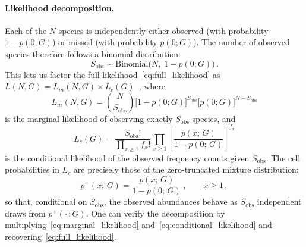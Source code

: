 \documentclass{article}
\begin{document}
{\paragraph{Likelihood decomposition.}
Each of the $N$ species is independently either observed (with probability $1 - p(0;G)$) or missed (with probability $p(0;G)$). The number of observed species therefore follows a binomial distribution:
\[
S_{\mathrm{obs}} \sim \mathrm{Binomial}\bigl(N,\; 1 - p(0;G)\bigr)\,.
\]
This lets us factor the full likelihood~\eqref{eq:full_likelihood} as $L(N,G) = L_m(N,G) \times L_c(G)$~\cite{sanathanan1972}, where
\begin{equation}\label{eq:marginal_likelihood}
    L_m(N,G) = \binom{N}{S_{\mathrm{obs}}} 
    \bigl[1 - p(0;G)\bigr]^{S_{\mathrm{obs}}} 
    \bigl[p(0;G)\bigr]^{N - S_{\mathrm{obs}}}
\end{equation}
is the marginal likelihood of observing exactly $S_{\mathrm{obs}}$ species, and
\begin{equation}\label{eq:conditional_likelihood}
    L_c(G) = \frac{S_{\mathrm{obs}}!}{\displaystyle\prod_{x \geq 1} f_x!} 
    \prod_{x \geq 1} \left[\frac{p(x;\, G)}{1 - p(0;\, G)}\right]^{f_x}
\end{equation}
is the conditional likelihood of the observed frequency counts given $S_{\mathrm{obs}}$. The cell probabilities in $L_c$ are precisely those of the zero-truncated mixture distribution:
\begin{equation}\label{eq:zero_truncated}
    p^+(x;\, G) = \frac{p(x;\, G)}{1 - p(0;\, G)}\,, \qquad x \geq 1\,,
\end{equation}
so that, conditional on $S_{\mathrm{obs}}$, the observed abundances behave as $S_{\mathrm{obs}}$ independent draws from $p^+(\cdot\,; G)$. One can verify the decomposition by multiplying~\eqref{eq:marginal_likelihood} and~\eqref{eq:conditional_likelihood} and recovering~\eqref{eq:full_likelihood}.

}
\end{document}
